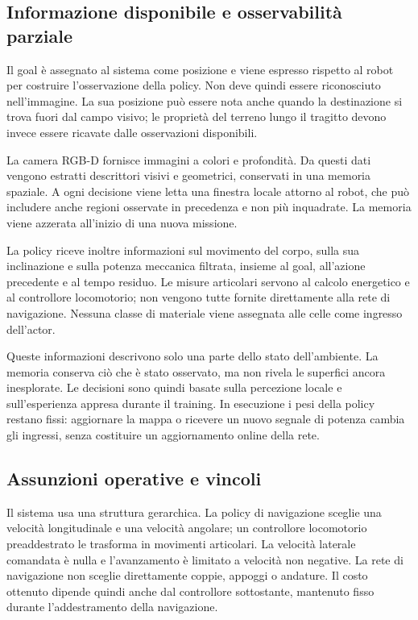 \subsection{Informazione disponibile e osservabilit\`a parziale}

Il goal è assegnato al sistema come posizione e viene espresso rispetto al robot per costruire l'osservazione della policy. Non deve quindi essere riconosciuto nell'immagine. La sua posizione può essere nota anche quando la destinazione si trova fuori dal campo visivo; le proprietà del terreno lungo il tragitto devono invece essere ricavate dalle osservazioni disponibili.

La camera RGB-D fornisce immagini a colori e profondità. Da questi dati vengono estratti descrittori visivi e geometrici, conservati in una memoria spaziale. A ogni decisione viene letta una finestra locale attorno al robot, che può includere anche regioni osservate in precedenza e non più inquadrate. La memoria viene azzerata all'inizio di una nuova missione.

La policy riceve inoltre informazioni sul movimento del corpo, sulla sua inclinazione e sulla potenza meccanica filtrata, insieme al goal, all'azione precedente e al tempo residuo. Le misure articolari servono al calcolo energetico e al controllore locomotorio; non vengono tutte fornite direttamente alla rete di navigazione. Nessuna classe di materiale viene assegnata alle celle come ingresso dell'actor.

Queste informazioni descrivono solo una parte dello stato dell'ambiente. La memoria conserva ciò che è stato osservato, ma non rivela le superfici ancora inesplorate. Le decisioni sono quindi basate sulla percezione locale e sull'esperienza appresa durante il training. In esecuzione i pesi della policy restano fissi: aggiornare la mappa o ricevere un nuovo segnale di potenza cambia gli ingressi, senza costituire un aggiornamento online della rete.

\subsection{Assunzioni operative e vincoli}

Il sistema usa una struttura gerarchica. La policy di navigazione sceglie una velocità longitudinale e una velocità angolare; un controllore locomotorio preaddestrato le trasforma in movimenti articolari. La velocità laterale comandata è nulla e l'avanzamento è limitato a velocità non negative. La rete di navigazione non sceglie direttamente coppie, appoggi o andature. Il costo ottenuto dipende quindi anche dal controllore sottostante, mantenuto fisso durante l'addestramento della navigazione.

